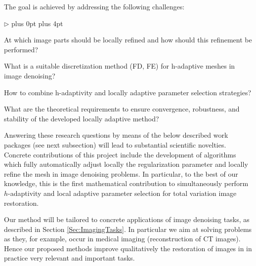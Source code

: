\documentclass[enabledeprecatedfontcommands,cleardoublepage=empty,headsepline,twoside,11pt,DIV=15,BCOR=12mm,final]{scrartcl}
\renewenvironment{itemize}
{\begin{list}{$\triangleright$}{\labelwidth-2mm \leftmargin3mm %
  \itemsep5pt plus 0pt  \topsep3pt \parsep1pt plus 4pt \labelsep2mm}}
{\end{list}}
\begin{document}
The goal is achieved by addressing the following challenges:
\begin{itemize}
\item At which image parts should be locally refined and how should this refinement be performed?
\item What is a suitable discretization method (FD, FE) for h-adaptive meshes in image denoising?
\item How to combine h-adaptivity and locally adaptive parameter selection strategies? 
\item What are the theoretical requirements to ensure convergence, robustness, and stability of the developed locally adaptive method?
\end{itemize}
Answering these research questions by means of the below described work packages (see next subsection) will lead to substantial scientific novelties. Concrete contributions of this project include the development of algorithms which fully automatically adjust locally the regularization parameter and locally refine the mesh in image denoising problems. In particular, to the best of our knowledge, this is the first mathematical contribution to simultaneously perform $h$-adaptivity and local adaptive parameter selection for total variation image restoration.

Our method will be tailored to concrete applications of image denoising tasks, as described in Section \ref{Sec:ImagingTasks}. In particular we aim at solving problems as they, for example, occur in medical imaging (reconstruction of CT images).  Hence our proposed methods improve qualitatively the restoration of images in in practice very relevant and important tasks. %

\end{document}
